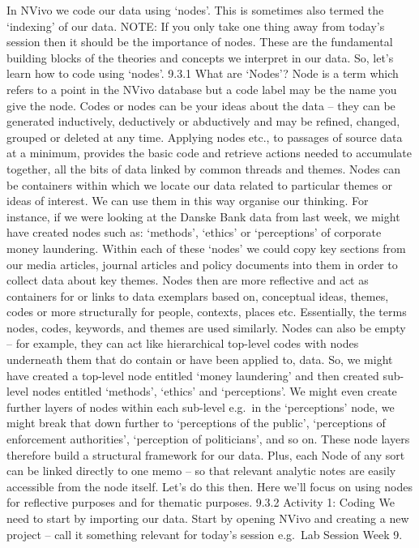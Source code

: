 \documentclass[
]{book}
\begin{document}
In NVivo we code our data using `nodes'. This is sometimes also termed the `indexing' of our data.
NOTE: If you only take one thing away from today's session then it should be the importance of nodes. These are the fundamental building blocks of the theories and concepts we interpret in our data.
So, let's learn how to code using `nodes'.
9.3.1 What are `Nodes'?
Node is a term which refers to a point in the NVivo database but a code label may be the name you give the node. Codes or nodes can be your ideas about the data -- they can be generated inductively, deductively or abductively and may be refined, changed, grouped or deleted at any time. Applying nodes etc., to passages of source data at a minimum, provides the basic code and retrieve actions needed to accumulate together, all the bits of data linked by common threads and themes.
Nodes can be containers within which we locate our data related to particular themes or ideas of interest. We can use them in this way organise our thinking. For instance, if we were looking at the Danske Bank data from last week, we might have created nodes such as: `methods', `ethics' or `perceptions' of corporate money laundering. Within each of these `nodes' we could copy key sections from our media articles, journal articles and policy documents into them in order to collect data about key themes. Nodes then are more reflective and act as containers for or links to data exemplars based on, conceptual ideas, themes, codes or more structurally for people, contexts, places etc. Essentially, the terms nodes, codes, keywords, and themes are used similarly.
Nodes can also be empty -- for example, they can act like hierarchical top-level codes with nodes underneath them that do contain or have been applied to, data. So, we might have created a top-level node entitled `money laundering' and then created sub-level nodes entitled `methods', `ethics' and `perceptions'. We might even create further layers of nodes within each sub-level e.g.~in the `perceptions' node, we might break that down further to `perceptions of the public', `perceptions of enforcement authorities', `perception of politicians', and so on.
These node layers therefore build a structural framework for our data. Plus, each Node of any sort can be linked directly to one memo -- so that relevant analytic notes are easily accessible from the node itself.
Let's do this then. Here we'll focus on using nodes for reflective purposes and for thematic purposes.
9.3.2 Activity 1: Coding
We need to start by importing our data. Start by opening NVivo and creating a new project -- call it something relevant for today's session e.g.~Lab Session Week 9.
\end{document}
